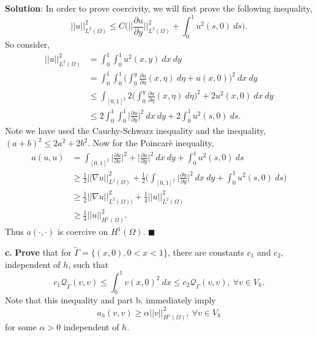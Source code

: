 \documentclass[11pt]{article}
\begin{document}
\vskip 1cm

{\bf Solution}: In order to prove coercivity, we will first prove the following inequality,
\begin{equation*}
    ||u||^2_{L^2(\Omega)} \leq C \Big( \Big|\Big|\frac{\partial u}{\partial y}\Big|\Big|^2_{L^2(\Omega)} + \int_0^1 u^2(s,0) \: ds \Big).
\end{equation*}
So consider,
\begin{align*}
    ||u||^2_{L^2(\Omega)} &= \int_0^1 \int_0^1 u^2(x,y) \: dx \: dy \\
    &= \int_0^1 \int_0^1 \Big( \int_0^y \frac{\partial u}{\partial \eta}(x, \eta) \: d\eta + u(x,0) \Big)^2 \: dx \: dy \\
    &\leq \int_{[0,1]^2} 2 \Big( \int_0^y \frac{\partial u}{\partial \eta} (x,\eta) \: d\eta \Big)^2 + 2u^2(x,0) \: dx \: dy \\
    &\leq 2\int_0^1\int_0^1 \Big| \frac{\partial u}{\partial y} \Big|^2 \: dx \: dy + 2 \int_0^1 u^2(s,0) \: ds.
\end{align*}
Note we have used the Cauchy-Schwarz inequality and the inequality, $(a + b)^2 \leq 2a^2 + 2b^2$.
Now for the Poincar\`{e} inequality,
\begin{align*}
    a(u,u) &= \int_{[0,1]^2} \Big| \frac{\partial u}{\partial x} \Big|^2 + \Big| \frac{\partial u}{\partial y} \Big|^2 \: dx \: dy + \int_0^1 u^2(s,0) \: ds \\
    &\geq \frac{1}{2}||\nabla u||^2_{L^2(\Omega)} + \frac{1}{2} \Big( \int_{[0,1]^2} \Big| \frac{\partial u}{\partial y} \Big|^2 \: dx \: dy + \int_0^1 u^2(s,0) \: ds \Big) \\
    &\geq \frac{1}{2} ||\nabla u||^2_{L^2(\Omega))} + \frac{1}{4} ||u||^2_{L^2(\Omega)} \\
    &\geq \frac{1}{4} ||u||^2_{H^1(\Omega)}.
\end{align*}
Thus $a(\cdot, \cdot)$ is coercive on $H^1(\Omega)$.
$\blacksquare$



\vskip 2cm



{\bf c.} {\bf Prove} that for $\tilde{\Gamma} = \{ (x,0), 0 < x < 1 \}$, there are constants $c_1$ and $c_2$, independent of $h$, such that 
\begin{equation}
    c_1\mathcal{Q}_{\tilde{\Gamma}} (v,v) \leq \int_0^1 v(x,0)^2 \: dx \leq c_2\mathcal{Q}_{\tilde{\Gamma}} (v,v), \: \forall v \in V_h.
\end{equation}
Note that this inequality and part b. immediately imply 
\begin{equation}
    a_h(v,v) \geq \alpha ||v||^2_{H^1(\Omega)}, \: \forall v \in V_h    
\end{equation}
for some $\alpha > 0$ independent of $h$.
\end{document}
